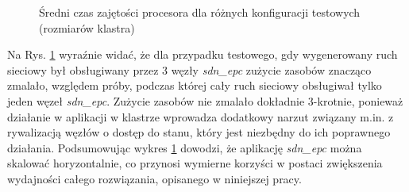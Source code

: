 \begin{figure}[h]
\centering
{}
\caption{Średni czas zajętości procesora dla różnych konfiguracji testowych
  (rozmiarów klastra)}
\label{plot:cpu_usage}
\end{figure}

Na Rys. \ref{plot:cpu_usage} wyraźnie widać, że dla przypadku testowego, gdy
wygenerowany ruch sieciowy był obsługiwany przez 3 węzły \textit{sdn\_epc}
zużycie zasobów znacząco zmalało, względem próby, podczas której cały ruch
sieciowy obsługiwał tylko jeden węzeł \textit{sdn\_epc}. Zużycie zasobów nie
zmalało dokładnie 3-krotnie, ponieważ działanie w aplikacji w klastrze wprowadza
dodatkowy narzut związany m.in. z rywalizacją węzłów o dostęp do stanu, który
jest niezbędny do ich poprawnego działania. Podsumowując wykres
\ref{plot:cpu_usage} dowodzi, że aplikację \textit{sdn\_epc} można skalować
horyzontalnie, co przynosi wymierne korzyści w postaci zwiększenia wydajności
całego rozwiązania, opisanego w niniejszej pracy.